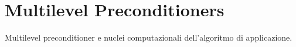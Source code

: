 \section{Multilevel Preconditioners}
%
Multilevel preconditioner e nuclei computazionali dell’algoritmo di applicazione.
